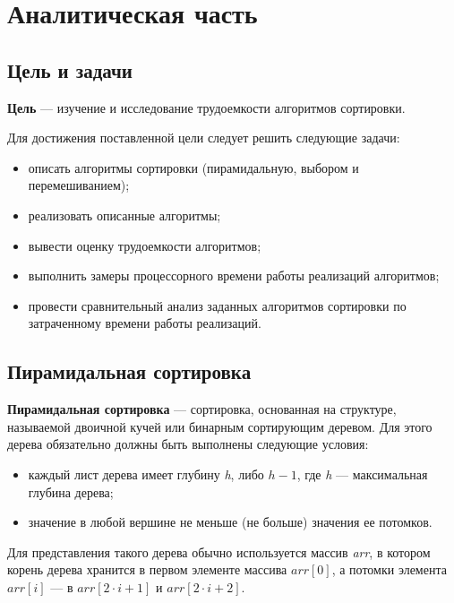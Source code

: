 \chapter{Аналитическая часть}

\section{Цель и задачи}

 \textbf{Цель} --- изучение и исследование трудоемкости алгоритмов сортировки.\newline

Для достижения поставленной цели следует решить следующие задачи:
\begin{itemize}[label=---]
        \item описать алгоритмы сортировки (пирамидальную, выбором и перемешиванием);
        \item реализовать описанные алгоритмы;
        \item вывести оценку трудоемкости алгоритмов;
        \item выполнить замеры процессорного времени работы реализаций алгоритмов;
        \item провести сравнительный анализ заданных алгоритмов сортировки по затраченному времени работы реализаций.
\end{itemize} 

\section{Пирамидальная сортировка}
\textbf{Пирамидальная сортировка} \cite{heapsort} --- сортировка, основанная на структуре, называемой двоичной кучей или бинарным сортирующим деревом. Для этого дерева обязательно должны быть выполнены следующие условия:
\begin{itemize}[label=---]
    \item каждый лист дерева имеет глубину \textit{h}, либо $h - 1$, где \textit{h} --- максимальная глубина дерева;
    \item значение в любой вершине не меньше (не больше) значения ее потомков. 
\end{itemize}

Для представления такого дерева обычно используется массив \textit{arr}, в котором корень дерева хранится в первом элементе массива $arr[0]$, а потомки элемента $arr[i]$ --- в $arr[2\cdot i + 1]$ и $arr[2\cdot i + 2]$.

\clearpage


